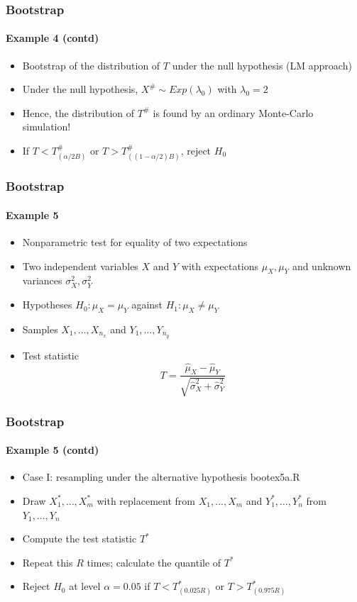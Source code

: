 \documentclass[smaller,compress]{beamer}
\begin{document}
\begin{frame}\frametitle{Bootstrap}\framesubtitle{Example 4 (contd)}
\begin{itemize}
    \item Bootstrap of the distribution of $T$ under the null hypothesis\newline
    (LM approach)\hspace*{\fill}{\tiny bootex4b.R}
    \item Under the null hypothesis, $X^{\#}\sim Exp(\lambda _{0})$ with $\lambda _{0}=2$
    \item Hence, the distribution of $T^{\#}$ is found by an ordinary Monte-Carlo simulation!
    \item If $T<T_{(\alpha /2B)}^{\#}$ or $T>T_{(\left( 1-\alpha /2\right)B)}^{\#}$, reject $H_{0}$
\end{itemize}
\end{frame}


\begin{frame}\frametitle{Bootstrap}\framesubtitle{Example 5}
\begin{itemize}
    \item Nonparametric test for equality of two expectations
    \item Two independent variables $X$ and $Y$ with expectations $\mu _{X},\mu_{Y}$ and unknown variances $\sigma _{X}^{2},\sigma _{Y}^{2}$
    \item Hypotheses $H_{0}:\mu _{X}=\mu _{Y}$ against $H_{1}:\mu _{X}\neq \mu_{Y}$
    \item Samples $X_{1},\ldots ,X_{n_x}$ and $Y_{1},\ldots ,Y_{n_y}$
    \item Test statistic
    \begin{equation*}
    T=\frac{\hat{\mu}_{X}-\hat{\mu}_{Y}}{\sqrt{\hat{\sigma}_{X}^{2}+\hat{\sigma}_{Y}^{2}}}
    \end{equation*}
\end{itemize}
\end{frame}


\begin{frame}\frametitle{Bootstrap}\framesubtitle{Example 5 (contd)}
\begin{itemize}
    \item Case I: resampling under the alternative hypothesis\hspace*{\fill}
    {\tiny bootex5a.R}
    \item Draw $X_{1}^{\ast },\ldots ,X_{m}^{\ast }$ with replacement from $X_{1},\ldots ,X_{m}$ \newline
    and $Y_{1}^{\ast },\ldots ,Y_{n}^{\ast }$ from $Y_{1},\ldots ,Y_{n}$
    \item Compute the test statistic $T^{\ast }$
    \item Repeat this $R$ times; calculate the quantile of $T^{\ast }$
    \item Reject $H_{0}$ at level $\alpha =0.05$ if $T<T_{(0.025R)}^{\ast }$ or $T>T_{(0.975R)}^{\ast }$
\end{itemize}
\end{frame}
\end{document}

